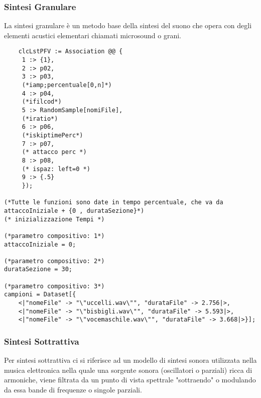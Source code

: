     \subsubsection*{Sintesi Granulare}

    La sintesi granulare è un metodo base della sintesi del suono che opera con degli elementi acustici elementari chiamati microsound o grani.

\begin{lstlisting}
    clcLstPFV := Association @@ {
     1 :> {1},
     2 :> p02,
     3 :> p03,
     (*iamp;percentuale[0,n]*)
     4 :> p04,
     (*ifilcod*)
     5 :> RandomSample[nomiFile],
     (*iratio*)
     6 :> p06,
     (*iskiptimePerc*)
     7 :> p07,
     (* attacco perc *)
     8 :> p08,
     (* ispaz: left=0 *)
     9 :> {.5}
     });

(*Tutte le funzioni sono date in tempo percentuale, che va da 
attaccoIniziale + {0 , durataSezione}*)
(* inizializzazione Tempi *)

(*parametro compositivo: 1*)
attaccoIniziale = 0;

(*parametro compositivo: 2*)
durataSezione = 30;

(*parametro compositivo: 3*)
campioni = Dataset[{
    <|"nomeFile" -> "\"uccelli.wav\"", "durataFile" -> 2.756|>,
    <|"nomeFile" -> "\"bisbigli.wav\"", "durataFile" -> 5.593|>,
    <|"nomeFile" -> "\"vocemaschile.wav\"", "durataFile" -> 3.668|>}];

\end{lstlisting}

\subsubsection*{Sintesi Sottrattiva}

Per sintesi sottrattiva ci si riferisce ad un modello di sintesi sonora utilizzata nella musica elettronica nella quale una sorgente sonora (oscillatori o parziali) ricca di armoniche,
 viene filtrata da un punto di vista spettrale "sottraendo" o modulando da essa bande di frequenze o singole parziali.


